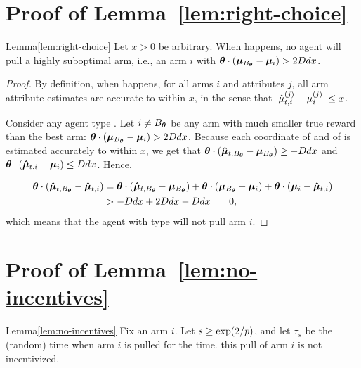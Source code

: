 \section{Proof of Lemma~\ref{lem:right-choice}}
\label{sec:lemma7-proof}

\begin{rlemma}{Lemma}{\ref{lem:right-choice}}
Let $x > 0$ be arbitrary.
When  happens,
no agent \AgV will pull a highly suboptimal arm, i.e., an arm $i$ with 
$\bm{\theta} \cdot (\bm{\mu}_{B_{\bm{\theta}}} - \bm{\mu}_{i}) > 2D d x$.
\end{rlemma}

\begin{proof}
By definition, when  happens,
for all arms $i$ and attributes $j$,
all arm attribute estimates are accurate to within $x$,
in the sense that
$|\hat{\mu}_{t,i}^{(j)} - \mu_{i}^{(j)}| \leq x$.

Consider any agent type \AgV.
Let $i \neq B_{\bm{\theta}}$ be any arm
with much smaller true reward than the best arm:
$\bm{\theta} \cdot (\bm{\mu}_{B_{\bm{\theta}}} - \bm{\mu}_{i}) > 2D d x$.
Because each coordinate of  and of
 is estimated accurately to within $x$, 
we get that 
$\bm{\theta} \cdot (\bm{\hat{\mu}}_{t,B_{\bm{\theta}}} - \bm{\mu}_{B_{\bm{\theta}}})
\geq - D d x$
and
$\bm{\theta} \cdot (\bm{\hat{\mu}}_{t,i} - \bm{\mu}_{i}) \leq D d x$.
Hence, 

\begin{align}
\bm{\theta} \cdot (\bm{\hat{\mu}}_{t,B_{\bm{\theta}}} - \bm{\hat{\mu}}_{t,i})
& =
\bm{\theta} \cdot (\bm{\hat{\mu}}_{t,B_{\bm{\theta}}} - \bm{\mu}_{B_{\bm{\theta}}})
+ \bm{\theta} \cdot (\bm{\mu}_{B_{\bm{\theta}}} - \bm{\mu}_{i})
+ \bm{\theta} \cdot (\bm{\mu}_{i} - \bm{\hat{\mu}}_{t,i}) \nonumber\\
& > -D d x + 2 D d x - D d x
\; = \; 0, \label{equ:choice}
\end{align}
which means that the agent with type \AgV will not pull arm $i$.
\end{proof}


\section{Proof of Lemma~\ref{lem:no-incentives}}
\label{sec:lemma8-proof}

\begin{rlemma}{Lemma}{\ref{lem:no-incentives}}
Fix an arm $i$.
Let $s \geq \exp(2/p)$, and let $\tau_s$ be the (random)
time when arm $i$ is pulled for the  time.
this pull of arm $i$ is not incentivized.
\end{rlemma}

